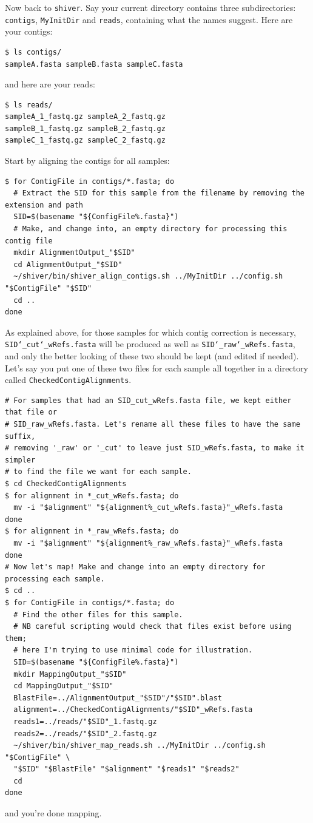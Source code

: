 \documentclass{article}
\newcommand{\shiv}{\c{shiver}\xspace}
\let\c\texttt
\begin{document}
Now back to \shiv.
Say your current directory contains three subdirectories: \c{contigs}, \c{MyInitDir} and \c{reads}, containing what the names suggest.
Here are your contigs:
\begin{Verbatim}[samepage=true]
$ ls contigs/
sampleA.fasta sampleB.fasta sampleC.fasta
\end{Verbatim}
and here are your reads:
\begin{Verbatim}[samepage=true]
$ ls reads/
sampleA_1_fastq.gz sampleA_2_fastq.gz  
sampleB_1_fastq.gz sampleB_2_fastq.gz  
sampleC_1_fastq.gz sampleC_2_fastq.gz
\end{Verbatim}
Start by aligning the contigs for all samples:
\begin{Verbatim}[samepage=true]
$ for ContigFile in contigs/*.fasta; do  
  # Extract the SID for this sample from the filename by removing the extension and path
  SID=$(basename "${ConfigFile%.fasta}")
  # Make, and change into, an empty directory for processing this contig file
  mkdir AlignmentOutput_"$SID"  
  cd AlignmentOutput_"$SID"  
  ~/shiver/bin/shiver_align_contigs.sh ../MyInitDir ../config.sh "$ContigFile" "$SID"
  cd ..
done
\end{Verbatim}
As explained above, for those samples for which contig correction is necessary, \c{SID\char`_cut\char`_wRefs.fasta} will be produced as well as \c{SID\char`_raw\char`_wRefs.fasta}, and only the better looking of these two should be kept (and edited if needed).
Let's say you put one of these two files for each sample all together in a directory called \c{CheckedContigAlignments}.  
\begin{Verbatim}[samepage=true]
# For samples that had an SID_cut_wRefs.fasta file, we kept either that file or
# SID_raw_wRefs.fasta. Let's rename all these files to have the same suffix,
# removing '_raw' or '_cut' to leave just SID_wRefs.fasta, to make it simpler
# to find the file we want for each sample.
$ cd CheckedContigAlignments  
$ for alignment in *_cut_wRefs.fasta; do
  mv -i "$alignment" "${alignment%_cut_wRefs.fasta}"_wRefs.fasta
done
$ for alignment in *_raw_wRefs.fasta; do
  mv -i "$alignment" "${alignment%_raw_wRefs.fasta}"_wRefs.fasta
done
# Now let's map! Make and change into an empty directory for processing each sample.
$ cd ..
$ for ContigFile in contigs/*.fasta; do  
  # Find the other files for this sample.
  # NB careful scripting would check that files exist before using them;
  # here I'm trying to use minimal code for illustration.
  SID=$(basename "${ConfigFile%.fasta}")
  mkdir MappingOutput_"$SID"
  cd MappingOutput_"$SID"
  BlastFile=../AlignmentOutput_"$SID"/"$SID".blast
  alignment=../CheckedContigAlignments/"$SID"_wRefs.fasta
  reads1=../reads/"$SID"_1.fastq.gz
  reads2=../reads/"$SID"_2.fastq.gz
  ~/shiver/bin/shiver_map_reads.sh ../MyInitDir ../config.sh "$ContigFile" \
  "$SID" "$BlastFile" "$alignment" "$reads1" "$reads2"
  cd
done
\end{Verbatim}
and you're done mapping.
\end{document}
